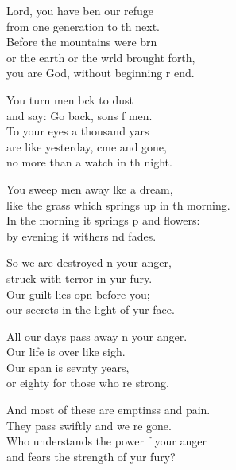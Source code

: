 \settowidth{\versewidth}{like the grass which springs up in the morning.}
\begin{psalmverse}%
  \begin{patverse}
 Lord, you have ben our refuge\Med\\
from one generation to th next.\\
Before the mountains were brn\Flex\\
or the earth or the wrld brought forth,\Med\\
you are God, without beginning r end.

You turn men bck to dust\Med\\
and say: Go back, sons f men.\\
To your eyes a thousand yars\Flex\\
are like yesterday, cme and gone,\Med\\
no more than a watch in th night.

You sweep men away l\pointup{\i}ke a dream,\Med\\
like the grass which springs up in th morning.\\
In the morning it springs p and flowers:\Med\\
by evening it withers nd fades.

So we are destroyed \pointup{\i}n your anger,\Med\\
struck with terror in yur fury.\\
Our guilt lies opn before you;\Med\\
our secrets in the light of yur face.

All our days pass away \pointup{\i}n your anger.\Med\\
Our life is over like  sigh.\\
Our span is sevnty years,\Med\\
or eighty for those who re strong.

And most of these are emptinss and pain.\Med\\
They pass swiftly and we re gone.\\
Who understands the power f your anger\Med\\
and fears the strength of yur fury?


\end{patverse}
\end{psalmverse}
